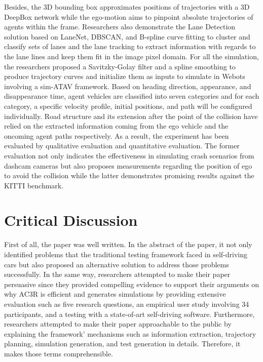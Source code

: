 \documentclass[10pt,a4paper]{report}
\begin{document}
%
Besides, the 3D bounding box approximates positions of trajectories with a 3D DeepBox network while the ego-motion aims to pinpoint absolute trajectories of agents within the frame.
%
Researchers also demonstrate the Lane Detection solution based on LaneNet, DBSCAN, and B-spline curve fitting to cluster and classify sets of lanes and the lane tracking to extract information with regards to the lane lines and keep them fit in the image pixel domain.
%
For all the simulation, the researchers proposed a Savitzky-Golay filter and a spline smoothing to produce trajectory curves and initialize them as inputs to simulate in Webots involving a sim-ATAV framework.
%
Based on heading direction, appearance, and disappearance time, agent vehicles are classified into seven categories and for each category, a specific velocity profile, initial positions, and path will be configured individually.
%
Road structure and its extension after the point of the collision have relied on the extracted information coming from the ego vehicle and the oncoming agent paths respectively.
%
As a result, the experiment has been evaluated by qualitative evaluation and quantitative evaluation.
%
The former evaluation not only indicates the effectiveness in simulating crash scenarios from dashcam cameras but also proposes measurements regarding the position of ego to avoid the collision
%
while the latter demonstrates promising results against the KITTI benchmark.

\section{Critical Discussion}
First of all, the paper was well written. In the abstract of the paper, it not only identified problems that the traditional testing framework faced in self-driving cars but also proposed an alternative solution to address those problems successfully. 
%
In the same way, researchers attempted to make their paper persuasive since they provided compelling evidence to support their arguments on why AC3R is efficient and generates simulations by providing extensive evaluation such as five research questions, an empirical user study involving 34 participants, and a testing with a state-of-art self-driving software.
%
Furthermore, researchers attempted to make their paper approachable to the public by explaining the framework' mechanisms such as information extraction, trajectory planning, simulation generation, and test generation in details. Therefore, it makes those terms comprehensible. 
\end{document}
